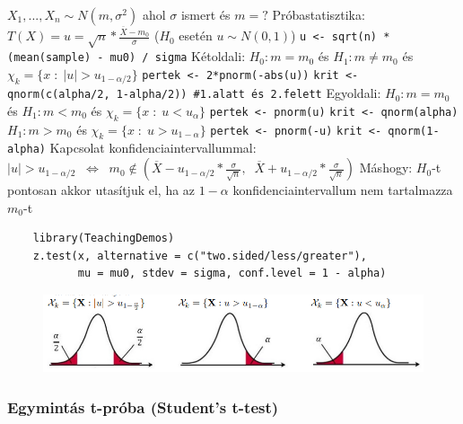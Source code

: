 \documentclass[12pt,a4paper]{article}
\begin{document}
\begin{outline}
	\1 $X_1,...,X_n \sim N(m,\sigma^2)$ ahol $\sigma$ ismert és $m=?$
	\1 Próbastatisztika: $T(X) = u = \sqrt{n}*\frac{\overline{X} - m_0}{\sigma}$
	\;\; ($H_0$ esetén $u \sim N(0,1)$)
		\2 \texttt{u <- sqrt(n) * (mean(sample) - mu0) / sigma}
	\1 Kétoldali: $H_0: m = m_0$ és $H_1: m \ne m_0$
	és $\chi_k = \{ x \;:\; |u| > u_{1-\alpha/2} \}$
		\2 \texttt{pertek <- 2*pnorm(-abs(u))}
		\2 \texttt{krit <- qnorm(c(alpha/2, 1-alpha/2)) \#1.alatt és 2.felett}
	\1 Egyoldali: $H_0: m = m_0$ és
		\2 $H_1: m < m_0$ és $\chi_k = \{ x \;:\; u < u_{\alpha} \}$
			\3 \texttt{pertek <- pnorm(u)}
			\3 \texttt{krit <- qnorm(alpha)}
		\2 $H_1: m > m_0$ és $\chi_k = \{ x \;:\; u > u_{1-\alpha} \}$
			\3 \texttt{pertek <- pnorm(-u)}
			\3 \texttt{krit <- qnorm(1-alpha)}
	\1 Kapcsolat konfidenciaintervallummal:
		\2 $|u| > u_{1-\alpha/2} \;\;\Leftrightarrow\;\; m_0 \notin
		(\overline{X} - u_{1-\alpha/2}*\frac{\sigma}{\sqrt{n}},\;\;
		\overline{X} + u_{1-\alpha/2}*\frac{\sigma}{\sqrt{n}})$
		\2 Máshogy: $H_0$-t pontosan akkor utasítjuk el, ha az $1-\alpha$ konfidenciaintervallum nem tartalmazza $m_0$-t
	\1 \begin{verbatim}
	library(TeachingDemos)
	z.test(x, alternative = c("two.sided/less/greater"),
	       mu = mu0, stdev = sigma, conf.level = 1 - alpha)
	\end{verbatim}
\end{outline}

\begin{figure}[h!]
	\centering
	\includegraphics[width=1\linewidth]{kritikus-tartományok}
\end{figure}

\pagebreak

\subsubsection{Egymintás t-próba (Student's t-test)}
\label{sec:próba-1minta-t}
\end{document}
